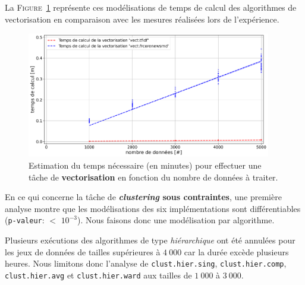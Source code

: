 			La \textsc{Figure~\ref{figure:4.3.2-ETUDE-COUTS-TEMPS-CALCUL-MODELISATION-VECTORIZATION}} représente ces modélisations de temps de calcul des algorithmes de vectorisation en comparaison avec les mesures réalisées lors de l'expérience.
			\newline
			\begin{figure}[!htb]
				\centering
				\includegraphics[width=0.95\textwidth]{figures/etude-temps-calcul-modelisation-2vect}
				\caption{
					Estimation du temps nécessaire (en minutes) pour effectuer une tâche de \textbf{vectorisation} en fonction du nombre de données à traiter.
				}
				\label{figure:4.3.2-ETUDE-COUTS-TEMPS-CALCUL-MODELISATION-VECTORIZATION}
			\end{figure}
			
			
			En ce qui concerne la tâche de \textbf{\textit{clustering} sous contraintes}, une première analyse montre que les modélisations des six implémentations sont différentiables (\texttt{p-valeur}: $<$ \texttt{$10^{-3}$}). Nous faisons donc une modélisation par algorithme.
			
			\begin{leftBarWarning}
				Plusieurs exécutions des algorithmes de type \textit{hiérarchique} ont été annulées pour les jeux de données de tailles supérieures à $4~000$ car la durée excède plusieurs heures.
				Nous limitons donc l'analyse de \texttt{clust.hier.sing}, \texttt{clust.hier.comp}, \texttt{clust.hier.avg} et \texttt{clust.hier.ward} aux tailles de $1~000$ à $3~000$.
			\end{leftBarWarning}
			
